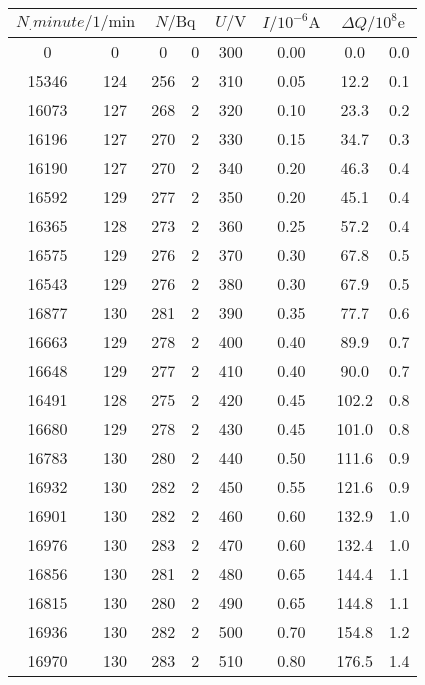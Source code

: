 \label{tab:tab}
	\begin{tabular}{S[table-format=5.0] @{${}\pm{}$} S[table-format=3.0]S[table-format=3.0] @{${}\pm{}$} S[table-format=1.0]S[table-format=3.0]S[table-format=1.2]S[table-format=3.1] @{${}\pm{}$} S[table-format=1.1]}
		\toprule
		 &  & {$U/\si{\volt}$} & {$I/10^{-6}\si{\ampere}$} &  \\
		 &   0 &   0 & 0 & 300 & 0.00 & 0.0 & 0.0 \\
		15346 & 124 & 256 & 2 & 310 & 0.05 & 12.2 & 0.1 \\
		16073 & 127 & 268 & 2 & 320 & 0.10 & 23.3 & 0.2 \\
		16196 & 127 & 270 & 2 & 330 & 0.15 & 34.7 & 0.3 \\
		16190 & 127 & 270 & 2 & 340 & 0.20 & 46.3 & 0.4 \\
		16592 & 129 & 277 & 2 & 350 & 0.20 & 45.1 & 0.4 \\
		16365 & 128 & 273 & 2 & 360 & 0.25 & 57.2 & 0.4 \\
		16575 & 129 & 276 & 2 & 370 & 0.30 & 67.8 & 0.5 \\
		16543 & 129 & 276 & 2 & 380 & 0.30 & 67.9 & 0.5 \\
		16877 & 130 & 281 & 2 & 390 & 0.35 & 77.7 & 0.6 \\
		16663 & 129 & 278 & 2 & 400 & 0.40 & 89.9 & 0.7 \\
		16648 & 129 & 277 & 2 & 410 & 0.40 & 90.0 & 0.7 \\
		16491 & 128 & 275 & 2 & 420 & 0.45 & 102.2 & 0.8 \\
		16680 & 129 & 278 & 2 & 430 & 0.45 & 101.0 & 0.8 \\
		16783 & 130 & 280 & 2 & 440 & 0.50 & 111.6 & 0.9 \\
		16932 & 130 & 282 & 2 & 450 & 0.55 & 121.6 & 0.9 \\
		16901 & 130 & 282 & 2 & 460 & 0.60 & 132.9 & 1.0 \\
		16976 & 130 & 283 & 2 & 470 & 0.60 & 132.4 & 1.0 \\
		16856 & 130 & 281 & 2 & 480 & 0.65 & 144.4 & 1.1 \\
		16815 & 130 & 280 & 2 & 490 & 0.65 & 144.8 & 1.1 \\
		16936 & 130 & 282 & 2 & 500 & 0.70 & 154.8 & 1.2 \\
		16970 & 130 & 283 & 2 & 510 & 0.80 & 176.5 & 1.4 \\

\end{tabular}
